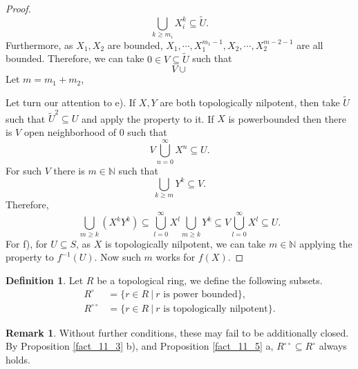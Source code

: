 \documentclass[10pt]{article}
\numberwithin{equation}{section}
\theoremstyle{definition}
\newtheorem{definition}{Definition}[subsection]
\newtheorem{remark}{Remark}[subsection]
\newcommand{\N}[0]{\mathbb{N}}
\newcommand{\sep}[0]{\:|\:}
\newcommand{\dcirc}[0]{{\circ\circ}}
\begin{document}
\begin{proof}
    \begin{equation*}
        \bigcup_{k\geq m_i}X_i^k \subseteq\tilde{U}.
    \end{equation*}
    Furthermore, as $X_1,X_2$ are bounded, $X_1,\cdots,X_1^{m_1-1},X_2,\cdots,X_2^{m-2-1}$ are all bounded. Therefore, we can take $0\in V\subseteq\tilde{U}$ such that
    \begin{equation*}
        V\cup
    \end{equation*}Let $m=m_1+m_2$,
    \par Let turn our attention to e). If $X,Y$ are both topologically nilpotent, then take $\tilde{U}$ such that $\tilde{U}^2\subseteq U$ and apply the property to it. If $X$ is powerbounded then there is $V$ open neighborhood of $0$ such that
    \begin{equation*}
        V\bigcup_{n=0}^\infty X^n \subseteq U.
    \end{equation*}
    For such $V$ there is $m\in \N$ such that
    \begin{equation*}
        \bigcup_{k\geq m} Y^k\subseteq V.
    \end{equation*}
    Therefore,
    \begin{equation*}
        \bigcup_{m\geq k} (X^kY^k) \subseteq \bigcup_{l=0}^\infty X^l \bigcup_{m\geq k}Y^k \subseteq V\bigcup_{l=0}^\infty X^l\subseteq U.
    \end{equation*}
    For f), for $U\subseteq S$, as $X$ is topologically nilpotent, we can take $m\in\N$ applying the property to $f^{-1}(U)$. Now such $m$ works for $f(X)$.
\end{proof}
\begin{definition}
    \label{definition_11_4}
    Let $R$ be a topological ring, we define the following subsets.
    \begin{align*}
        R^\circ & = \{r\in R\sep \text{$r$ is power bounded}\},\\
        R^{\circ\circ}&=\{r\in R\sep \text{$r$ is topologically nilpotent}\}.
    \end{align*}
\end{definition}
\begin{remark}
    Without further conditions, these may fail to be additionally closed. By Proposition \ref{fact_11_3} b), and Proposition \ref{fact_11_5} a, $R^\dcirc\subseteq R^\circ$ always holds.
\end{remark}
\end{document}
